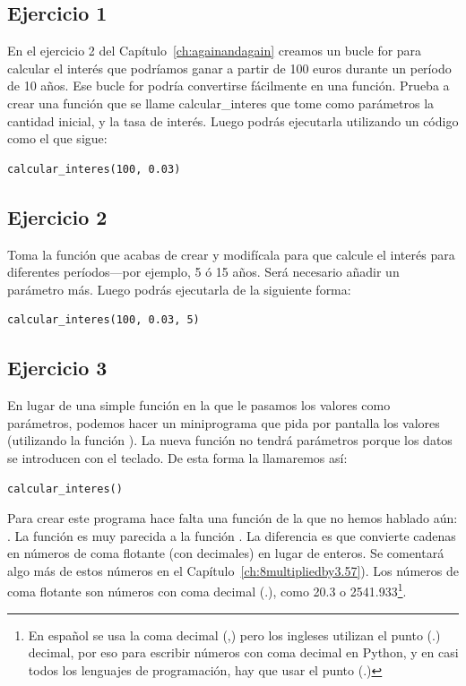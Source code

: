 \subsection*{Ejercicio 1}
En el ejercicio 2 del Capítulo~\ref{ch:againandagain} creamos un bucle for para calcular el interés que podríamos ganar a partir de 100 euros durante un período de 10 años.  Ese bucle for podría convertirse fácilmente en una función.  Prueba a crear una función que se llame calcular\_interes que tome como parámetros la cantidad inicial, y la tasa de interés.  Luego podrás ejecutarla utilizando un código como el que sigue:

\begin{listing}
\begin{verbatim}
calcular_interes(100, 0.03)
\end{verbatim}
\end{listing}

\subsection*{Ejercicio 2}
Toma la función que acabas de crear y modifícala para que calcule el interés para diferentes períodos---por ejemplo, 5 ó 15 años. Será necesario añadir un parámetro más.  Luego podrás ejecutarla de la siguiente forma:

\begin{listing}
\begin{verbatim}
calcular_interes(100, 0.03, 5)
\end{verbatim}
\end{listing}

\subsection*{Ejercicio 3}
En lugar de una simple función en la que le pasamos los valores como parámetros, podemos hacer un miniprograma que pida por pantalla los valores (utilizando la función ).  La nueva función no tendrá parámetros porque los datos se introducen con el teclado. De esta forma la llamaremos así:

\begin{listing}
\begin{verbatim}
calcular_interes()
\end{verbatim}
\end{listing}

\noindent
Para crear este programa hace falta una función de la que no hemos hablado aún: . La función  es muy parecida a la función . La diferencia es que convierte cadenas en números de coma flotante (con decimales) en lugar de enteros. Se comentará algo más de estos números en el Capítulo~\ref{ch:8multipliedby3.57}).  Los números de coma flotante son números con coma decimal (.), como 20.3 o 2541.933\footnote{En español se usa la coma decimal (,) pero los ingleses utilizan el punto (.) decimal, por eso para escribir números con coma decimal en Python, y en casi todos los lenguajes de programación, hay que usar el punto (.)}.

\newpage
